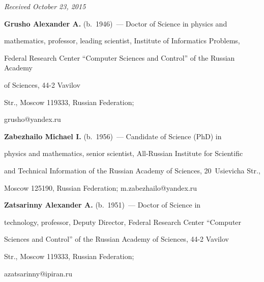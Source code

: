 \vspace*{-3pt}





\hfill{\small\textit{Received October 23, 2015}}


    


    


\Contr





\noindent


\textbf{Grusho Alexander A.} (b.\ 1946)~--- Doctor of Science in physics and 


mathematics, professor, leading scientist, Institute of Informatics Problems, 


Federal Research Center ``Computer Sciences and Control'' of the Russian Academy 


of Sciences, 44-2 Vavilov 


    Str., Moscow 119333, Russian Federation;


grusho@yandex.ru 





\vspace*{3pt}





\noindent


\textbf{Zabezhailo Michael I.} (b.\ 1956)~--- Candidate of Science (PhD) in 


physics and mathematics, senior scientist, All-Russian Institute for Scientific 


and Technical Information of the Russian Academy of Sciences, 20~Usievicha Str., 


Moscow 125190, Russian Federation; m.zabezhailo@yandex.ru





\vspace*{3pt}





\noindent


\textbf{Zatsarinny Alexander A.} (b.\ 1951)~--- Doctor of Science in 


technology, professor, Deputy Director, Federal Research Center ``Computer 


Sciences and Control'' of the Russian Academy of Sciences, 44-2 Vavilov 


    Str., Moscow 119333, Russian Federation;


azatsarinny@ipiran.ru


    


\label{end\stat}








\renewcommand{\bibname}{\protect\rm Литература}





 


 


 


 


